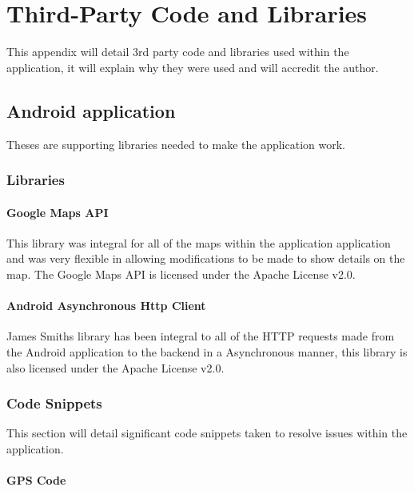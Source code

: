 \chapter{Third-Party Code and Libraries}

This appendix will detail 3rd party code and libraries used within the application, it will explain why they were used and will accredit the author.

\lstjava

\section{Android application}

Theses are supporting libraries needed to make the application work.

\subsection{Libraries}

\subsubsection{Google Maps API}

This library \cite{Google:MappingAPI:2015:online} was integral for all of the maps within the application application and was very flexible in allowing modifications to be made to show details on the map. The Google Maps API is licensed under the Apache License v2.0.

\subsubsection{Android Asynchronous Http Client}

James Smiths library \cite{JamesSmith:AjaxRestLib:2015:online} has been integral to all of the HTTP requests made from the Android application to the backend in a Asynchronous manner, this library is also licensed under the Apache License v2.0.

\subsection{Code Snippets}

This section will detail significant code snippets taken to resolve issues within the application.

\subsubsection{GPS Code}

